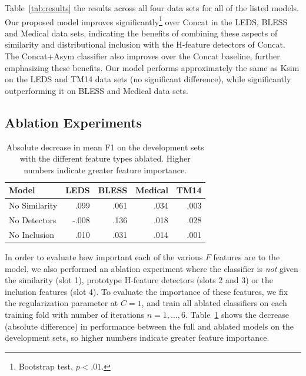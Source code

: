 Table~\ref{tab:results} the results across all four data sets for all of the
listed models. Our proposed model improves significantly\footnote{Bootstrap test, $p<.01$.} over Concat in the LEDS,
BLESS and Medical data sets, indicating the benefits of combining these aspects of
similarity and distributional inclusion with the H-feature detectors of Concat.
The Concat+Asym classifier also improves over the Concat baseline, further
emphasizing these benefits. Our model performs approximately the same as Ksim
on the LEDS and TM14 data sets (no significant difference),
while significantly outperforming it on BLESS and Medical data sets.

\subsection{Ablation Experiments}
\begin{table}
\centering
\begin{small}
\begin{tabular}{|l|rrrr|}
  \hline
  Model         &      LEDS   &      BLESS  &      Medical  &      TM14   \\
  \hline
  No Similarity &      .099   &      .061   &      .034     &      .003   \\
  No Detectors  &     -.008   &      .136   &      .018     &      .028   \\
  No Inclusion  &      .010   &      .031   &      .014     &      .001   \\
  \hline
\end{tabular}
\end{small}
\caption{Absolute decrease in mean F1 on the development sets with the
different feature types ablated. Higher numbers indicate greater feature
importance.}

\label{tab:ablation}
\end{table}

In order to evaluate how important each of the various $F$ features are to the
model, we also performed an ablation experiment where the classifier is {\em
not} given the similarity (slot 1), prototype H-feature detectors (slots 2 and
3) or the inclusion features (slot 4). To evaluate the importance of these
features, we fix the regularization parameter at $C = 1$, and train all
ablated classifiers on each training fold with number of iterations
$n = {1, \ldots, 6}$. Table~\ref{tab:ablation} shows the decrease (absolute difference) in performance
between the full and ablated models on the development sets, so higher numbers indicate greater
feature importance.

